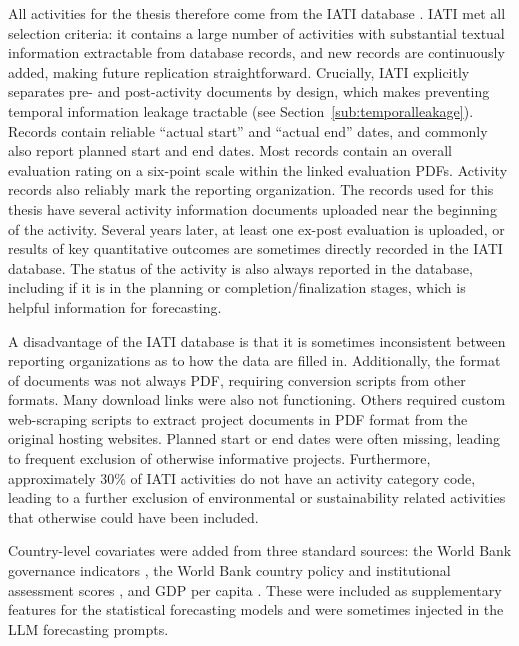 All activities for the thesis therefore come from the IATI database \citep{IATIDashboardIATI}. IATI met all selection criteria: it contains a large number of activities with substantial textual information extractable from database records, and new records are continuously added, making future replication straightforward. Crucially, IATI explicitly separates pre- and post-activity documents by design, which makes preventing temporal information leakage tractable (see Section~\ref{sub:temporalleakage}). Records contain reliable ``actual start'' and ``actual end'' dates, and commonly also report planned start and end dates. Most records contain an overall evaluation rating on a six-point scale within the linked evaluation PDFs. Activity records also reliably mark the reporting organization. The records used for this thesis have several activity information documents uploaded near the beginning of the activity. Several years later, at least one ex-post evaluation is uploaded, or results of key quantitative outcomes are sometimes directly recorded in the IATI database. The status of the activity is also always reported in the database, including if it is in the planning or completion/finalization stages, which is helpful information for forecasting.

A disadvantage of the IATI database is that it is sometimes inconsistent between reporting organizations as to how the data are filled in. Additionally, the format of documents was not always PDF, requiring conversion scripts from other formats. Many download links were also not functioning. Others required custom web-scraping scripts to extract project documents in PDF format from the original hosting websites. Planned start or end dates were often missing, leading to frequent exclusion of otherwise informative projects. Furthermore, approximately 30\% of IATI activities do not have an activity category code, leading to a further exclusion of environmental or sustainability related activities that otherwise could have been included.

Country-level covariates were added from three standard sources: the World Bank governance indicators \citep{kaufmannWorldwideGovernanceIndicators2024}, the World Bank country policy and institutional assessment scores \citep{worldbankCPIACriteria2024}, and GDP per capita \citep{worldbankGDPPerCapita}. These were included as supplementary features for the statistical forecasting models and were sometimes injected in the LLM forecasting prompts.




